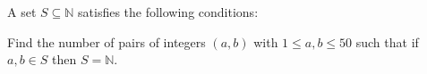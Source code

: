 A set $S \subseteq \mathbb{N}$ satisfies the following conditions:

\begin{enumerate}



\end{enumerate}

Find the number of pairs of integers $(a, b)$ with $1 \le a, b\le 50$ such that if $a, b \in S$ then $S = \mathbb{N}.$
